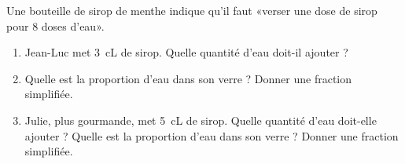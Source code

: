
\begin{exercice}\label{exosmath-0986}

    Une bouteille de sirop de menthe indique qu'il faut «verser une dose de sirop pour \( 8\) doses d'eau». 
    \begin{enumerate}
        \item
            Jean-Luc met \SI{3}{\centi\liter} de sirop. Quelle quantité d'eau doit-il ajouter ?
        \item
            Quelle est la proportion d'eau dans son verre ? Donner une fraction simplifiée.
        \item
            Julie, plus gourmande, met \SI{5}{\centi\liter} de sirop. Quelle quantité d'eau doit-elle ajouter ? Quelle est la proportion d'eau dans son verre ? Donner une fraction simplifiée.
    \end{enumerate}


\end{exercice}
